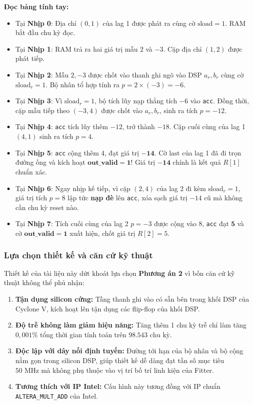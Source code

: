\par\noindent\textbf{Đọc bảng tính tay:}
\begin{itemize}[leftmargin=1.5em, itemsep=2pt]
    \item Tại \textbf{Nhịp 0}: Địa chỉ $(0, 1)$ của lag 1 được phát ra cùng cờ $\text{sload} = 1$. RAM bắt đầu chu kỳ đọc.
    \item Tại \textbf{Nhịp 1}: RAM trả ra hai giá trị mẫu $2$ và $-3$. Cặp địa chỉ $(1, 2)$ được phát tiếp.
    \item Tại \textbf{Nhịp 2}: Mẫu $2, -3$ được chốt vào thanh ghi ngõ vào DSP $a_r, b_r$ cùng cờ $\text{sload}_r = 1$. Bộ nhân tổ hợp tính ra $p = 2 \times (-3) = -6$.
    \item Tại \textbf{Nhịp 3}: Vì $\text{sload}_r = 1$, bộ tích lũy nạp thẳng tích $-6$ vào \texttt{acc}. Đồng thời, cặp mẫu tiếp theo $(-3, 4)$ được chốt vào $a_r, b_r$, sinh ra tích $p = -12$.
    \item Tại \textbf{Nhịp 4}: \texttt{acc} tích lũy thêm $-12$, trở thành $-18$. Cặp cuối cùng của lag 1 $(4, 1)$ sinh ra tích $p = 4$.
    \item Tại \textbf{Nhịp 5}: \texttt{acc} cộng thêm $4$, đạt giá trị $\mathbf{-14}$. Cờ $\text{last}$ của lag 1 đã đi trọn đường ống và kích hoạt $\mathbf{\text{out\_valid} = 1}$! Giá trị $\mathbf{-14}$ chính là kết quả $R[1]$ chuẩn xác.
    \item Tại \textbf{Nhịp 6}: Ngay nhịp kế tiếp, vì cặp $(2, 4)$ của lag 2 đi kèm $\text{sload}_r = 1$, giá trị tích $p = 8$ lập tức \textbf{nạp đè} lên \texttt{acc}, xóa sạch giá trị $-14$ cũ mà không cần chu kỳ reset nào.
    \item Tại \textbf{Nhịp 7}: Tích cuối cùng của lag 2 $p = -3$ được cộng vào $8$, \texttt{acc} đạt $\mathbf{5}$ và cờ $\mathbf{\text{out\_valid} = 1}$ xuất hiện, chốt giá trị $R[2] = 5$.
\end{itemize}

\subsubsection*{Lựa chọn thiết kế và căn cứ kỹ thuật}
Thiết kế của tài liệu này dứt khoát lựa chọn \textbf{Phương án 2} vì bốn căn cứ kỹ thuật không thể phủ nhận:
\begin{enumerate}[leftmargin=1.5em, itemsep=2pt]
    \item \textbf{Tận dụng silicon cứng:} Tầng thanh ghi vào có sẵn bên trong khối DSP của Cyclone V, kích hoạt lên tận dụng các flip-flop của khối DSP.
    \item \textbf{Độ trễ không làm giảm hiệu năng:} Tăng thêm 1 chu kỳ trễ chỉ làm tăng $0{,}001\%$ tổng thời gian tính toán trên $98.543\text{ chu kỳ}$.
    \item \textbf{Độc lập với dây nối định tuyến:} Đường tới hạn của bộ nhân và bộ cộng nằm gọn trong silicon DSP, giúp thiết kế dễ dàng đạt tần số mục tiêu $50\text{ MHz}$ mà không phụ thuộc vào vị trí bố trí linh kiện của Fitter.
    \item \textbf{Tương thích với IP Intel:} Cấu hình này tương đồng với IP chuẩn \texttt{ALTERA\_MULT\_ADD} của Intel.
\end{enumerate}

